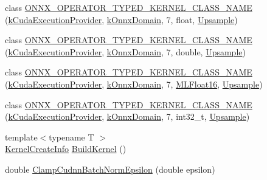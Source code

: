 \begin{DoxyCompactItemize}
\item 
class \mbox{\hyperlink{namespaceonnxruntime_1_1cuda_ac6b660c17bd4faead9290ffe4d008163}{O\+N\+N\+X\+\_\+\+O\+P\+E\+R\+A\+T\+O\+R\+\_\+\+T\+Y\+P\+E\+D\+\_\+\+K\+E\+R\+N\+E\+L\+\_\+\+C\+L\+A\+S\+S\+\_\+\+N\+A\+ME}} (\mbox{\hyperlink{namespaceonnxruntime_a73ebc64887ddd1968e3cef47ffefe35b}{k\+Cuda\+Execution\+Provider}}, \mbox{\hyperlink{namespaceonnxruntime_ac0e7c0c106a2c9e9594560a3ab289fa0}{k\+Onnx\+Domain}}, 7, float, \mbox{\hyperlink{classonnxruntime_1_1cuda_1_1Upsample}{Upsample}})
\item 
class \mbox{\hyperlink{namespaceonnxruntime_1_1cuda_a07fb47bab420da1419bdede460c94f8c}{O\+N\+N\+X\+\_\+\+O\+P\+E\+R\+A\+T\+O\+R\+\_\+\+T\+Y\+P\+E\+D\+\_\+\+K\+E\+R\+N\+E\+L\+\_\+\+C\+L\+A\+S\+S\+\_\+\+N\+A\+ME}} (\mbox{\hyperlink{namespaceonnxruntime_a73ebc64887ddd1968e3cef47ffefe35b}{k\+Cuda\+Execution\+Provider}}, \mbox{\hyperlink{namespaceonnxruntime_ac0e7c0c106a2c9e9594560a3ab289fa0}{k\+Onnx\+Domain}}, 7, double, \mbox{\hyperlink{classonnxruntime_1_1cuda_1_1Upsample}{Upsample}})
\item 
class \mbox{\hyperlink{namespaceonnxruntime_1_1cuda_a5e64173c7945a9a5171634e9abc987a8}{O\+N\+N\+X\+\_\+\+O\+P\+E\+R\+A\+T\+O\+R\+\_\+\+T\+Y\+P\+E\+D\+\_\+\+K\+E\+R\+N\+E\+L\+\_\+\+C\+L\+A\+S\+S\+\_\+\+N\+A\+ME}} (\mbox{\hyperlink{namespaceonnxruntime_a73ebc64887ddd1968e3cef47ffefe35b}{k\+Cuda\+Execution\+Provider}}, \mbox{\hyperlink{namespaceonnxruntime_ac0e7c0c106a2c9e9594560a3ab289fa0}{k\+Onnx\+Domain}}, 7, \mbox{\hyperlink{uniononnxruntime_1_1MLFloat16}{M\+L\+Float16}}, \mbox{\hyperlink{classonnxruntime_1_1cuda_1_1Upsample}{Upsample}})
\item 
class \mbox{\hyperlink{namespaceonnxruntime_1_1cuda_ae5944e118f972a07b1a383427d0dd5ed}{O\+N\+N\+X\+\_\+\+O\+P\+E\+R\+A\+T\+O\+R\+\_\+\+T\+Y\+P\+E\+D\+\_\+\+K\+E\+R\+N\+E\+L\+\_\+\+C\+L\+A\+S\+S\+\_\+\+N\+A\+ME}} (\mbox{\hyperlink{namespaceonnxruntime_a73ebc64887ddd1968e3cef47ffefe35b}{k\+Cuda\+Execution\+Provider}}, \mbox{\hyperlink{namespaceonnxruntime_ac0e7c0c106a2c9e9594560a3ab289fa0}{k\+Onnx\+Domain}}, 7, int32\+\_\+t, \mbox{\hyperlink{classonnxruntime_1_1cuda_1_1Upsample}{Upsample}})
\item 
{\footnotesize template$<$typename T $>$ }\\\mbox{\hyperlink{structonnxruntime_1_1KernelCreateInfo}{Kernel\+Create\+Info}} \mbox{\hyperlink{namespaceonnxruntime_1_1cuda_a4cf9fae99ef47f1c08fda7013e95bca5}{Build\+Kernel}} ()
\item 
double \mbox{\hyperlink{namespaceonnxruntime_1_1cuda_ada3a9cb32e02dd0c20c7d959500aac74}{Clamp\+Cudnn\+Batch\+Norm\+Epsilon}} (double epsilon)

\end{DoxyCompactItemize}
